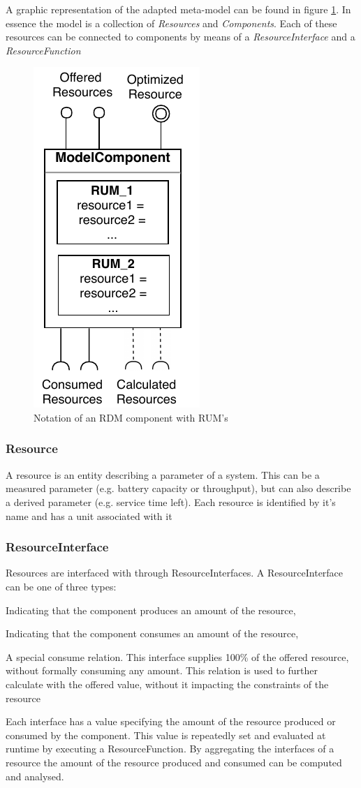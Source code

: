 A graphic representation of the adapted meta-model can be found in figure \ref{fig:component}. In essence the model is a collection of \emph{Resources} and \emph{Components}. Each of these resources can be connected to components by means of a \emph{ResourceInterface} and a \emph{ResourceFunction}
\begin{figure}
\centering
  \includegraphics[width=0.3\linewidth]{resources/img/component.pdf}
  \caption{Notation of an RDM component with RUM's}
  \label{fig:component}
\end{figure}

\subsubsection{Resource}
A resource is an entity describing a parameter of a system. This can be a measured parameter (e.g. battery capacity or throughput), but can also describe a derived parameter (e.g. service time left). Each resource is identified by it's name and has a unit associated with it

\subsubsection{ResourceInterface}
Resources are interfaced with through ResourceInterfaces. A ResourceInterface can be one of three types:
\begin{description}
\nospace
\item[Offer] Indicating that the component produces an amount of the resource,
\item[Consume] Indicating that the component consumes an amount of the resource,
\item[Calculate] A special consume relation. This interface supplies 100\% of the offered resource, without formally consuming any amount. This relation is used to further calculate with the offered value, without it impacting the constraints of the resource%
\end{description}
Each interface has a value specifying the amount of the resource produced or consumed by the component. This value is repeatedly set and evaluated at runtime by executing a ResourceFunction. By aggregating the interfaces of a resource the amount of the resource produced and consumed can be computed and analysed.

